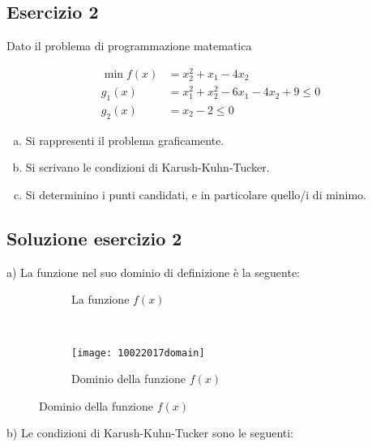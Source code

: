 \documentclass[\main/main.tex]{subfiles}
\begin{document}
\subsection{Esercizio 2}
Dato il problema di programmazione matematica

\begin{align*}
	\min f(x) & =x^2_2+x_1-4x_2                 \\
	g_1(x)    & =x^2_1+x^2_2-6x_1-4x_2+9 \leq 0 \\
	g_2(x)    & =x_2-2\leq0
\end{align*}

\begin{enumerate}[a)]
	\item Si rappresenti il problema graficamente.
	\item Si scrivano le condizioni di Karush-Kuhn-Tucker.
	\item Si determinino i punti candidati, e in particolare quello/i di minimo.
\end{enumerate}

\subsection{Soluzione esercizio 2}

a) La funzione nel suo dominio di definizione è la seguente:

\begin{figure}
	\begin{subfigure}{0.45\textwidth}
		\caption{La funzione $f(x)$}
	\end{subfigure}
	~
	\begin{subfigure}{0.45\textwidth}
		\texttt{[image: 10022017domain]}
		\caption{Dominio della funzione $f(x)$}
	\end{subfigure}
\end{figure}

b) Le condizioni di Karush-Kuhn-Tucker sono le seguenti:
\end{document}
